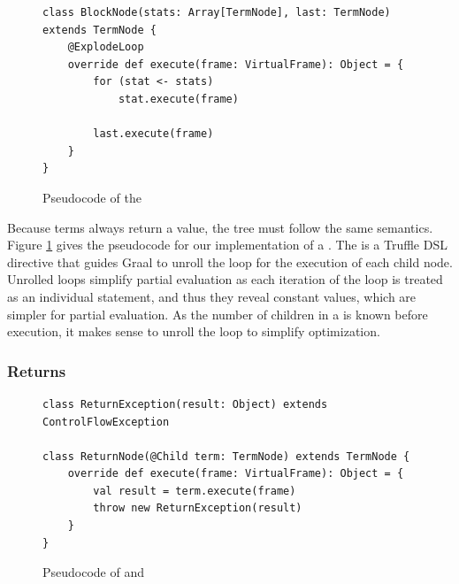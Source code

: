 \begin{figure}[!htb]
\begin{verbatim}
class BlockNode(stats: Array[TermNode], last: TermNode) extends TermNode {
	@ExplodeLoop
	override def execute(frame: VirtualFrame): Object = {
		for (stat <- stats) 
			stat.execute(frame)
				
		last.execute(frame)
	}
}
\end{verbatim}
\caption{Pseudocode of the }
\label{impl:block-node}
\end{figure}

Because terms always return a value, the  tree must follow the same semantics.
Figure \ref{impl:block-node} gives the pseudocode for our implementation of a .
The  is a Truffle DSL directive that guides Graal to unroll\cite{loop-unrolling} the loop for the execution of each child node.
Unrolled loops simplify partial evaluation as each iteration of the loop is treated as an individual statement, and thus they reveal constant values, which are simpler for partial evaluation.
As the number of children in a  is known before execution, it makes sense to unroll the loop to simplify optimization.

\subsubsection*{Returns}

\begin{figure}[!htb]
\begin{verbatim}
class ReturnException(result: Object) extends ControlFlowException

class ReturnNode(@Child term: TermNode) extends TermNode {
	override def execute(frame: VirtualFrame): Object = { 
		val result = term.execute(frame)
		throw new ReturnException(result)
	}
}
\end{verbatim}
\caption{Pseudocode of  and }
\label{impl:return}
\end{figure}

